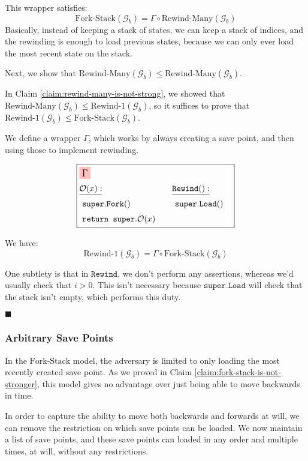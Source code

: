 This wrapper satisfies:
$$
\text{Fork-Stack}(\mathcal{G}_b) = \Gamma \circ \text{Rewind-Many}(\mathcal{G}_b)
$$
Basically, instead of keeping a stack of states, we can keep a stack of indices,
and the rewinding is enough to load previous states, because we can only ever load
the most recent state on the stack.

Next, we show that $\text{Rewind-Many}(\mathcal{G}_b) \leq \text{Rewind-Many}(\mathcal{G}_b)$.

In Claim \ref{claim:rewind-many-is-not-strong}, we showed that
$\text{Rewind-Many}(\mathcal{G}_b) \leq \text{Rewind-1}(\mathcal{G}_b)$, so
it suffices to prove that $\text{Rewind-1}(\mathcal{G}_b) \leq \text{Fork-Stack}(\mathcal{G}_b)$.

We define a wrapper $\Gamma$, which works by always creating a save point,
and then using those to implement rewinding.

$$
\boxed{
\begin{aligned}
&\colorbox{pink}{\large $\Gamma$}\cr
&\begin{aligned}
    &\underline{\mathcal{O}(x):}\cr
    &\ \texttt{super}.\texttt{Fork}()\cr
    &\ \texttt{return } \texttt{super}.\mathcal{O}(x)\cr
\end{aligned}
&\begin{aligned}
    &\underline{\texttt{Rewind}():}\cr
    &\ \texttt{super}.\texttt{Load}()\cr
    &\cr
\end{aligned}\cr
\end{aligned}
}
$$

We have:
$$
\text{Rewind-1}(\mathcal{G}_b) = \Gamma \circ \text{Fork-Stack}(\mathcal{G}_b)
$$

One subtlety is that in $\texttt{Rewind}$, we don't perform any assertions,
whereas we'd usually check that $i > 0$.
This isn't necessary because $\texttt{super}.\texttt{Load}$ will check that the stack
isn't empty, which performs this duty.

$\blacksquare$

\subsubsection{Arbitrary Save Points}

In the $\text{Fork-Stack}$ model, the adversary is limited to only
loading the most recently created save point.
As we proved in Claim \ref{claim:fork-stack-is-not-stronger}, this model
gives no advantage over just being able to move backwards in time.

In order to capture the ability to move both backwards and forwards
at will, we can remove the restriction on which save points can be loaded.
We now maintain a list of save points, and these save points can loaded
in any order and multiple times, at will, without any restrictions.

